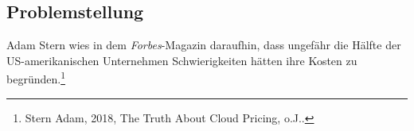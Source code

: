 \begin{comment} GELÖSCHT, WEIL DIESE EINE BEHAUPTUNG IST (25.10.2021)
    \\\\
    Für viele Unternehmen ist eine große Herausforderung, die Kosten von Cloud-Diensten übersichtlich zu halten und Optimierungsmöglichkeit leicht zu erkennen. Zusätzlich besteht die Gefahr, unangenehme Überraschungen in einer Rechnung zu bekommen, weil keine Grenze für den Konsum von Cloud-Diensten festgelegt wurde. 
    \end{comment}
\subsection{Problemstellung}
\begin{comment}
\\\\
”Heute hatten wir 17 Gäste für unsere derzeit 20 Zimmer. Für die kommende Messe am Wochenende sind wir bereit 500 Gäste zu empfangen. Nach der Messe werden wir mit unseren üblichen 20 Zimmern wie immer gut arbeiten können.”
Normalerweise bräuchte man eine große Investition zu machen, um solche kurzfristige Nachfrage zu erfüllen. Vergleichbar ist es bei traditionellen IT-Infrastrukturen, mehr Kapazitätsbedarf, würde die Anschaffung von einer neuen Hardware bedeuten.
\\\\
\end{comment}
Adam Stern wies in dem \textit{Forbes}-Magazin daraufhin, dass ungefähr die Hälfte der US-amerikanischen Unternehmen Schwierigkeiten hätten ihre Kosten zu begründen.\footnote{Stern Adam, 2018, The Truth About Cloud Pricing, o.J.\cite{SP1}.}\\ 
